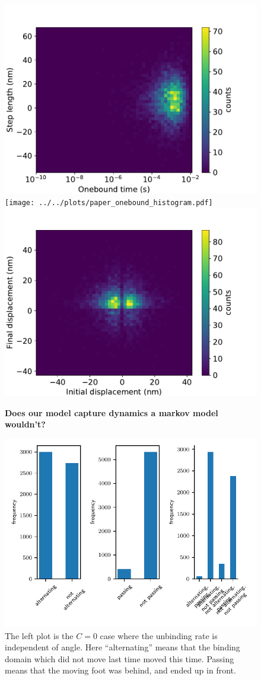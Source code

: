 \documentclass[9pt,twocolumn,twoside]{pnas-new}
\begin{document}
\begin{figure}[tbhp]
  \centering
  \includegraphics[width=\linewidth]{../../plots/paper_onebound_vs_steplength.pdf}
  \texttt{[image: ../../plots/paper\_onebound\_histogram.pdf]}
  \includegraphics[width=\linewidth]{../../plots/paper_initial_vs_final_displacement.pdf}
\caption{\textbf{Does our model capture dynamics a markov model wouldn't?}}
\label{fig:}
\end{figure}

\begin{figure}[tbhp]
    \includegraphics[width=0.5\linewidth]{../../plots/paper_foot_order_histogram.pdf}
\caption{The left plot is the $C=0$ case where the unbinding rate is
  independent of angle.  Here ``alternating'' means that the binding
  domain which did not move last time moved this time.  Passing means
  that the moving foot was behind, and ended up in front.}
\label{fig:steppingorder}
\end{figure}
\end{document}
